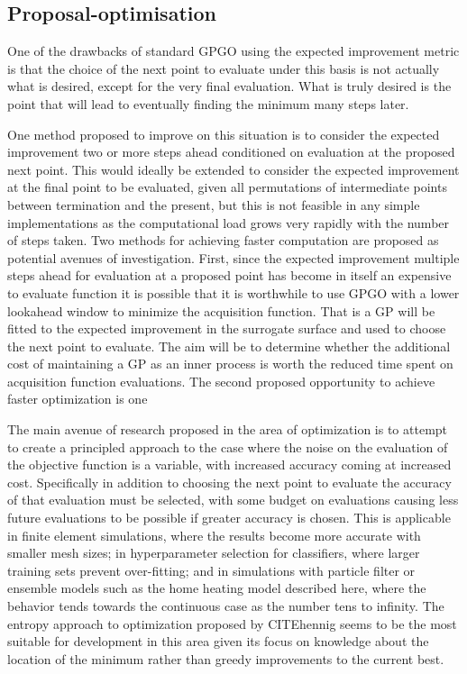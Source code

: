 \documentclass[a4paper, 10 pt, conference]{ieeeconf}  %
\begin{document}
\subsection{Proposal-optimisation}
One of the drawbacks of standard GPGO using the expected improvement metric is that the choice of the next point to evaluate under this basis is not actually what is desired, except for the very final evaluation. What is truly desired is the point that will lead to eventually finding the minimum many steps later.

One method proposed to improve on this situation is to consider the expected improvement two or more steps ahead conditioned on evaluation at the proposed next point. This would ideally be extended to consider the expected improvement at the final point to be evaluated, given all permutations of intermediate points between termination and the present, but this is not feasible in any simple implementations as the computational load grows very rapidly with the number of steps taken. Two methods for achieving faster computation are proposed as potential avenues of investigation. First, since the expected improvement multiple steps ahead for evaluation at a proposed point has become in itself an expensive to evaluate function it is possible that it is worthwhile to use GPGO with a lower lookahead window to minimize the acquisition function. That is a GP will be fitted to the expected improvement in the surrogate surface and used to choose the next point to evaluate. The aim will be to determine whether the additional cost of maintaining a GP as an inner process is worth the reduced time spent on acquisition function evaluations. The second proposed opportunity to achieve faster optimization is one 

The main avenue of research proposed in the area of optimization is to attempt to create a principled approach to the case where the noise on the evaluation of the objective function is a variable, with increased accuracy coming at increased cost. Specifically in addition to choosing the next point to evaluate the accuracy of that evaluation must be selected, with some budget on evaluations causing less future evaluations to be possible if greater accuracy is chosen. This is applicable in finite element simulations, where the results become more accurate with smaller mesh sizes; in hyperparameter selection for classifiers, where larger training sets prevent over-fitting; and in simulations with particle filter or ensemble models such as the home heating model described here, where the behavior tends towards the continuous case as the number tens to infinity. The entropy approach to optimization proposed by CITEhennig seems to be the most suitable for development in this area given its focus on knowledge about the location of the minimum rather than greedy improvements to the current best.
\end{document}
